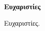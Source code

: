\clearpage
\thispagestyle{plain}

\vspace*{\fill}
\begin{center}
  \vspace{-4cm} %
  \textbf{Ευχαριστίες}
  
  \vspace{1.5em} %
  \parbox{0.75\textwidth}
  {%
    Ευχαριστίες.
  }
\end{center}
\vspace*{\fill}

